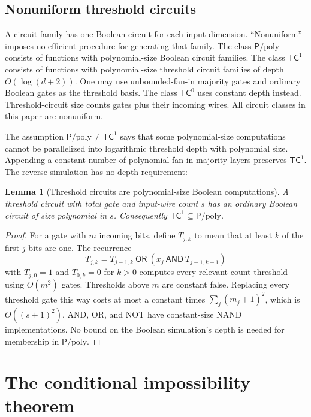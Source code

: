 \documentclass[11pt]{article}
\newtheorem{lemma}[theorem]{Lemma}
\theoremstyle{remark}\newtheorem{remark}[theorem]{Remark}
\newcommand{\Pp}{\mathsf P/\mathrm{poly}}
\newcommand{\TC}{\mathsf{TC}}
\begin{document}
\subsection{Nonuniform threshold circuits}

A circuit family has one Boolean circuit for each input dimension.
``Nonuniform'' imposes no efficient procedure for generating that family.
The class $\Pp$ consists of functions with polynomial-size Boolean circuit
families. The class $\TC^1$ consists of functions with polynomial-size
threshold circuit families of depth $O(\log(d+2))$. One may use
unbounded-fan-in majority gates and ordinary Boolean gates as the
threshold basis. The class $\TC^0$ uses constant depth instead.
Threshold-circuit size counts gates plus their incoming wires.
All circuit classes in this paper are nonuniform.

The assumption $\Pp\ne\TC^1$ says that some polynomial-size computations
cannot be parallelized into logarithmic threshold depth with polynomial
size. Appending a constant number of polynomial-fan-in majority layers
preserves $\TC^1$. The reverse simulation has no depth requirement:

\begin{lemma}[Threshold circuits are polynomial-size Boolean computations]
\label{lem:threshold-boolean}
A threshold circuit with total gate and input-wire count $s$ has an
ordinary Boolean circuit of size polynomial in $s$. Consequently
$\TC^1\subseteq\Pp$.
\end{lemma}
\begin{proof}
For a gate with $m$ incoming bits, define $T_{j,k}$ to mean that at least
$k$ of the first $j$ bits are one. The recurrence
\[
 T_{j,k}=T_{j-1,k}\ \mathsf{OR}\
             (x_j\ \mathsf{AND}\ T_{j-1,k-1})
\]
with $T_{j,0}=1$ and $T_{0,k}=0$ for $k>0$ computes every relevant count
threshold using $O(m^2)$ gates. Thresholds above $m$ are constant false.
Replacing every threshold gate this way costs at most a constant times
$\sum_j(m_j+1)^2$, which is $O((s+1)^2)$. AND, OR, and NOT have constant-size
NAND implementations. No bound on the Boolean simulation's depth is
needed for membership in $\Pp$.
\end{proof}

\section{The conditional impossibility theorem}
\end{document}
